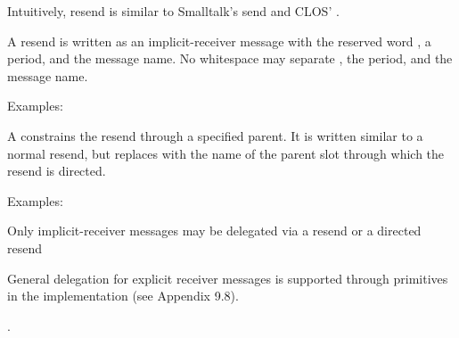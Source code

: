 \documentclass[letterpaper,10pt,english]{sphinxmanual}
\begin{document}
Intuitively, resend is similar to Smalltalk’s  send and CLOS’ .

A resend is written as an implicit-receiver message with the reserved word , a period, and the message name. No whitespace may separate , the period, and the message name.

Examples:

\begin{sphinxVerbatim}[commandchars=\\\{\}]
 
   
\end{sphinxVerbatim}

A  constrains the resend through a specified parent. It is written similar to a normal resend, but replaces  with the name of the parent slot through which the resend is directed.

Examples:

\begin{sphinxVerbatim}[commandchars=\\\{\}]
   
\end{sphinxVerbatim}

Only implicit-receiver messages may be delegated via a resend or a directed resend %
\begin{footnote}[9]\sphinxAtStartFootnote
General delegation for explicit receiver messages is supported through primitives in the implementation (see Appendix 9.8).
%
\end{footnote}.

\end{document}
